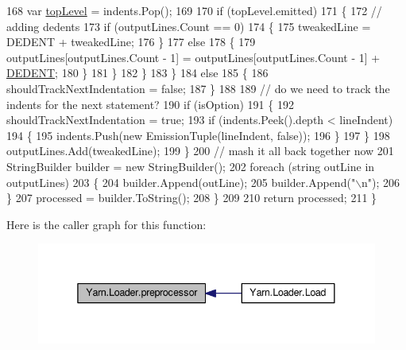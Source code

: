 \begin{DoxyCode}
168                             var \hyperlink{a00336_a8b7e5c0b2c6870eaa8f9454b4f33678b}{topLevel} = indents.Pop();
169 
170                             \textcolor{keywordflow}{if} (topLevel.emitted)
171                             \{
172                                 \textcolor{comment}{// adding dedents}
173                                 \textcolor{keywordflow}{if} (outputLines.Count == 0)
174                                 \{
175                                     tweakedLine = DEDENT + tweakedLine;
176                                 \}
177                                 \textcolor{keywordflow}{else}
178                                 \{
179                                     outputLines[outputLines.Count - 1] = outputLines[outputLines.Count - 1]
       + \hyperlink{a00336_a83653c3e52fa74614e655a91ad2b7181}{DEDENT};
180                                 \}
181                             \}
182                         \}
183                     \}
184                     \textcolor{keywordflow}{else}
185                     \{
186                         shouldTrackNextIndentation = \textcolor{keyword}{false};
187                     \}
188 
189                     \textcolor{comment}{// do we need to track the indents for the next statement?}
190                     \textcolor{keywordflow}{if} (isOption)
191                     \{
192                         shouldTrackNextIndentation = \textcolor{keyword}{true};
193                         \textcolor{keywordflow}{if} (indents.Peek().depth < lineIndent)
194                         \{
195                             indents.Push(\textcolor{keyword}{new} EmissionTuple(lineIndent, \textcolor{keyword}{false}));
196                         \}
197                     \}
198                     outputLines.Add(tweakedLine);
199                 \}
200                 \textcolor{comment}{// mash it all back together now}
201                 StringBuilder builder = \textcolor{keyword}{new} StringBuilder();
202                 \textcolor{keywordflow}{foreach} (\textcolor{keywordtype}{string} outLine \textcolor{keywordflow}{in} outputLines)
203                 \{
204                     builder.Append(outLine);
205                     builder.Append(\textcolor{stringliteral}{"\(\backslash\)n"});
206                 \}
207                 processed = builder.ToString();
208             \}
209 
210             \textcolor{keywordflow}{return} processed;
211         \}
\end{DoxyCode}


Here is the caller graph for this function\-:
\nopagebreak
\begin{figure}[H]
\begin{center}
\leavevmode
\includegraphics[width=338pt]{a00127_a0b09a29edd2ed13d52203f1b71a47081_icgraph}
\end{center}
\end{figure}


